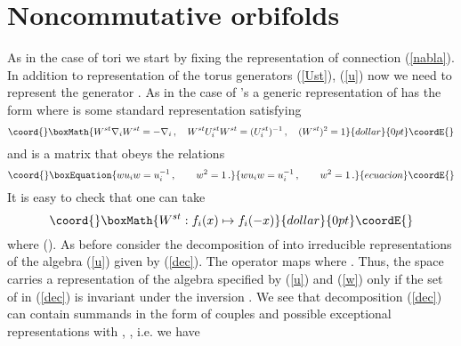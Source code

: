 \documentclass[a4paper,a4paper]{article}
\begin{document}
{\section{Noncommutative \coordHE{} orbifolds}
As in the case of tori we start by fixing the representation of connection (\ref{nabla}). In addition to representation 
of the torus generators (\ref{Ust}), (\ref{u}) now we need to represent the \coordHE{} generator \coordHE{}. 
As in the case of \coordHE{}'s a generic representation of \coordHE{} has the form \coordHE{} where \coordHE{} is some standard representation 
satisfying 
$$\coord{}\boxMath{
W^{st}\nabla_{i}W^{st} = - \nabla_{i} \, , \quad W^{st}U_{i}^{st}W^{st} = (U_{i}^{st})^{-1} \, , \quad (W^{st})^{2} = 1 
}{dollar}{0pt}\coordE{}$$
and \coordHE{} is a \coordHE{} matrix that obeys the relations 
\begin{equation}\coord{}\boxEquation{\label{w}
wu_{i}w=u_{i}^{-1} \, , \qquad w^{2} = 1 \, .
}{wu_{i}w=u_{i}^{-1} \, , \qquad w^{2} = 1 \, .
}{ecuacion}\coordE{}\end{equation}
It is easy to check that one can take 
$$\coord{}\boxMath{
W^{st} : f_{i}(x) \mapsto f_{i}(-x) 
}{dollar}{0pt}\coordE{}$$
where \coordHE{} (\coordHE{}). 
As before consider  the decomposition of  \coordHE{} into irreducible representations of the algebra (\ref{u}) given by (\ref{dec}).  
 The operator \coordHE{} maps \coordHE{} 
where \coordHE{}. Thus, the space \coordHE{} carries a representation 
of the algebra specified by (\ref{u}) and (\ref{w}) only if the set of \coordHE{} in (\ref{dec}) is 
invariant under the inversion \coordHE{}. We see that  decomposition (\ref{dec}) can contain
summands in the form  of couples \coordHE{}  and  possible  exceptional representations 
\coordHE{} with \coordHE{}, \coordHE{}, i.e. we have 
}
\end{document}
